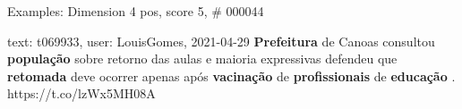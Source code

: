 \begin{frame}{Examples: Dimension 4 pos, score 5, \# 000044}
\footnotesize
\begin{exampleblock}{text: t069933, user: LouisGomes, 2021-04-29}
\textbf{Prefeitura} de Canoas consultou \textbf{população} sobre retorno das 
aulas e maioria expressivas defendeu que \textbf{retomada} deve ocorrer apenas 
após \textbf{vacinação} de \textbf{profissionais} de \textbf{educação} . 
https://t.co/lzWx5MH08A 
\end{exampleblock}
\end{frame}
